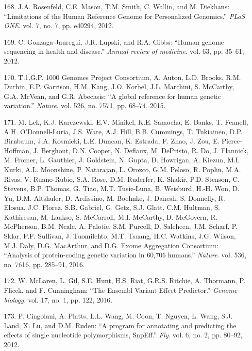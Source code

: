 \documentclass[12pt,a4paper,twoside]{ugathesis}
\theoremstyle{definition}
\theoremstyle{definition}
\theoremstyle{definition}
\theoremstyle{remark}
\begin{document}
\hypertarget{ref-Rosenfeld2012}{}
168. J.A. Rosenfeld, C.E. Mason, T.M. Smith, C. Wallin, and M. Diekhans:
``Limitations of the Human Reference Genome for Personalized Genomics.''
\emph{PLoS ONE}. vol. 7, no. 7, pp. e40294, 2012.

\hypertarget{ref-Gonzaga-Jauregui2012}{}
169. C. Gonzaga-Jauregui, J.R. Lupski, and R.A. Gibbs: ``Human genome
sequencing in health and disease.'' \emph{Annual review of medicine}.
vol. 63, pp. 35--61, 2012.

\hypertarget{ref-1000GenomesProjectConsortium2015}{}
170. T.1.G.P. 1000 Genomes Project Consortium, A. Auton, L.D. Brooks,
R.M. Durbin, E.P. Garrison, H.M. Kang, J.O. Korbel, J.L. Marchini, S.
McCarthy, G.A. McVean, and G.R. Abecasis: ``A global reference for human
genetic variation.'' \emph{Nature}. vol. 526, no. 7571, pp. 68--74,
2015.

\hypertarget{ref-Lek2016}{}
171. M. Lek, K.J. Karczewski, E.V. Minikel, K.E. Samocha, E. Banks, T.
Fennell, A.H. O'Donnell-Luria, J.S. Ware, A.J. Hill, B.B. Cummings, T.
Tukiainen, D.P. Birnbaum, J.A. Kosmicki, L.E. Duncan, K. Estrada, F.
Zhao, J. Zou, E. Pierce-Hoffman, J. Berghout, D.N. Cooper, N. Deflaux,
M. DePristo, R. Do, J. Flannick, M. Fromer, L. Gauthier, J. Goldstein,
N. Gupta, D. Howrigan, A. Kiezun, M.I. Kurki, A.L. Moonshine, P.
Natarajan, L. Orozco, G.M. Peloso, R. Poplin, M.A. Rivas, V.
Ruano-Rubio, S.A. Rose, D.M. Ruderfer, K. Shakir, P.D. Stenson, C.
Stevens, B.P. Thomas, G. Tiao, M.T. Tusie-Luna, B. Weisburd, H.-H. Won,
D. Yu, D.M. Altshuler, D. Ardissino, M. Boehnke, J. Danesh, S. Donnelly,
R. Elosua, J.C. Florez, S.B. Gabriel, G. Getz, S.J. Glatt, C.M. Hultman,
S. Kathiresan, M. Laakso, S. McCarroll, M.I. McCarthy, D. McGovern, R.
McPherson, B.M. Neale, A. Palotie, S.M. Purcell, D. Saleheen, J.M.
Scharf, P. Sklar, P.F. Sullivan, J. Tuomilehto, M.T. Tsuang, H.C.
Watkins, J.G. Wilson, M.J. Daly, D.G. MacArthur, and D.G. Exome
Aggregation Consortium: ``Analysis of protein-coding genetic variation
in 60,706 humans.'' \emph{Nature}. vol. 536, no. 7616, pp. 285--91,
2016.

\hypertarget{ref-McLaren2016}{}
172. W. McLaren, L. Gil, S.E. Hunt, H.S. Riat, G.R.S. Ritchie, A.
Thormann, P. Flicek, and F. Cunningham: ``The Ensembl Variant Effect
Predictor.'' \emph{Genome biology}. vol. 17, no. 1, pp. 122, 2016.

\hypertarget{ref-Cingolani2012}{}
173. P. Cingolani, A. Platts, L.L. Wang, M. Coon, T. Nguyen, L. Wang,
S.J. Land, X. Lu, and D.M. Ruden: ``A program for annotating and
predicting the effects of single nucleotide polymorphisms, SnpEff.''
\emph{Fly}. vol. 6, no. 2, pp. 80--92, 2012.
\end{document}
